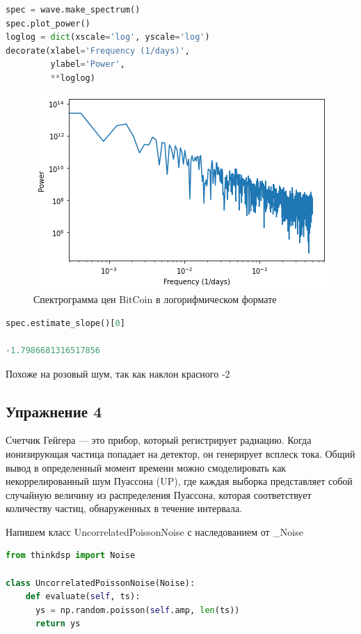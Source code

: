 \begin{lstlisting}[language=Python]
spec = wave.make_spectrum()
spec.plot_power()
loglog = dict(xscale='log', yscale='log')
decorate(xlabel='Frequency (1/days)',
         ylabel='Power', 
         **loglog)
\end{lstlisting}

\begin{figure}[H]
	\begin{center}
		\includegraphics[scale=1]{fig/lab04/lab04_09.png}
		\caption{Спектрограмма цен BitCoin в логорифмическом формате}
	\end{center}
\end{figure}

\begin{lstlisting}[language=Python]
spec.estimate_slope()[0]

-1.7986681316517856
\end{lstlisting}

Похоже на розовый шум, так как наклон красного -2


\subsection{Упражнение 4}

Счетчик Гейгера — это прибор, который регистрирует радиацию. Когда ионизирующая частица попадает на детектор, он генерирует всплеск тока. Общий вывод в определенный момент времени можно смоделировать как некоррелированный шум Пуассона (UP), где каждая выборка представляет собой случайную величину из распределения Пуассона, которая соответствует количеству частиц, обнаруженных в течение интервала.

Напишем класс UncorrelatedPoissonNoise с наследованием от _Noise

\begin{lstlisting}[language=Python]
from thinkdsp import Noise

class UncorrelatedPoissonNoise(Noise):
    def evaluate(self, ts):
      ys = np.random.poisson(self.amp, len(ts))
      return ys
\end{lstlisting}

